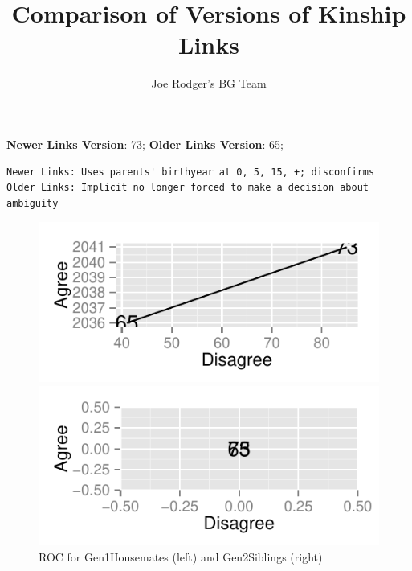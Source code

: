 \documentclass[a4paper]{article}\usepackage{graphicx, color}
\title{Comparison of Versions of Kinship Links}
\author{Joe Rodger's BG Team}
\makeatletter
\def\maxwidth{ %
  \ifdim\Gin@nat@width>\linewidth
    \linewidth
  \else
    \Gin@nat@width
  \fi
}
\newenvironment{kframe}{%
 \def\at@end@of@kframe{}%
 \ifinner\ifhmode%
  \def\at@end@of@kframe{\end{minipage}}%
  \begin{minipage}{\columnwidth}%
 \fi\fi%
 \def\FrameCommand##1{\hskip\@totalleftmargin \hskip-\fboxsep
 \colorbox{shadecolor}{##1}\hskip-\fboxsep
     \hskip-\linewidth \hskip-\@totalleftmargin \hskip\columnwidth}%
 \MakeFramed {\advance\hsize-\width
   \@totalleftmargin\z@ \linewidth\hsize
   \@setminipage}}%
 {\par\unskip\endMakeFramed%
 \at@end@of@kframe}
\newenvironment{knitrout}{}{} %
\makeatother
\begin{document}
\maketitle

\setlength{\parindent}{0pt}%







\textbf{Newer Links Version}: 73;
\textbf{Older Links Version}: 65;

\begin{knitrout}
\color{fgcolor}\begin{kframe}
\begin{verbatim}
Newer Links: Uses parents' birthyear at 0, 5, 15, +; disconfirms
Older Links: Implicit no longer forced to make a decision about ambiguity
\end{verbatim}
\end{kframe}
\end{knitrout}


\begin{figure}[htbp]
\begin{knitrout}
\color{fgcolor}
\includegraphics[width=\maxwidth]{figure/unnamed-chunk-31} 

\includegraphics[width=\maxwidth]{figure/unnamed-chunk-32} 

\end{knitrout}

\caption{ROC for Gen1Housemates (left) and Gen2Siblings (right)}
\end{figure}
\end{document}
